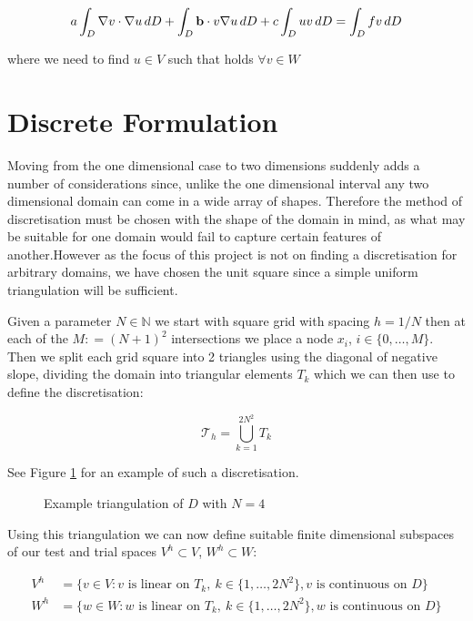 \begin{equation}\label{eq:wk-twod-deterministic}
    a\int_{D}\nabla{v}\cdot\nabla{u}\,dD +
    \int_{D}\mathbf{b}\cdot v\nabla{u}\,dD + c\int_{D}uv\,dD =
    \int_{D}fv\,dD
\end{equation}

where we need to find $u \in V$ such that 
holds $\forall v \in W$

\section{Discrete Formulation}


Moving from the one dimensional case to two dimensions suddenly adds a number
of considerations since, unlike the one dimensional interval any two
dimensional domain can come in a wide array of shapes. Therefore the method of
discretisation must be chosen with the shape of the domain in mind, as what may
be suitable for one domain would fail to capture certain features of
another.However as the focus of this project is not on finding a discretisation
for arbitrary domains, we have chosen the unit square since a simple uniform
triangulation will be sufficient.

Given a parameter $N \in \mathbb{N}$ we start with square grid with spacing $h
= 1/N$ then at each of the $M: = (N+1)^2$ intersections we place a node $x_i$,
$i \in \{0,\ldots,M\}$. Then we split each grid square into 2 triangles
using the diagonal of negative slope, dividing the domain into triangular
elements $T_k$ which we can then use to define the discretisation:

\[
    \mathcal{T}_h = \bigcup_{k=1}^{2N^2} T_k
\]

See Figure \ref{fig:two-d-discretisation} for an example of such a
discretisation.

\begin{figure}
\centering

\caption{Example triangulation of $D$ with $N = 4$}
\label{fig:two-d-discretisation}
\end{figure}

Using this triangulation we can now define suitable finite dimensional subspaces
of our test and trial spaces $V^h \subset V$, $W^h \subset W$:

\begin{align*}
    V^h &= \{v \in V: v \text{ is linear on } T_k,\ k \in \{1,\ldots,2N^2\},
                     v \text{ is continuous on } D\} \\
    W^h &= \{w \in W: w \text{ is linear on } T_k,\ k \in \{1,\ldots,2N^2\},
                     w \text{ is continuous on } D\}
\end{align*}

